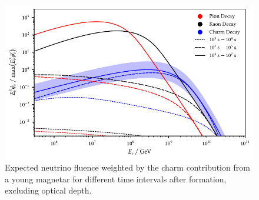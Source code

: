 \begin{figure}[H]
	\centering
	\includegraphics{../plots/build/magnetar_integrated_neutrino_spectrum_without.pdf}
	\caption[Magnetar $\nu \kern+0.5pt$ fluence compared to $c$ decay without optical depth.]
			{Expected neutrino fluence weighted by the charm contribution from a young magnetar for different time
			 intervals after formation, excluding optical depth.}
	\label{fig:magnetar-fluence-without}
\end{figure}

